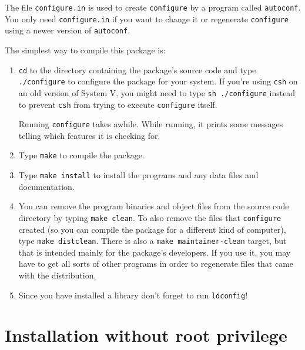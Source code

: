    The file \verb+configure.in+ is used to create \verb+configure+ by a program
called \verb+autoconf+.  You only need \verb+configure.in+ if you want to change
it or regenerate \verb+configure+ using a newer version of \verb+autoconf+.

The simplest way to compile this package is:
\begin{enumerate}
 \item \verb+cd+ to the directory containing the package's source code and type
     \verb+./configure+ to configure the package for your system.  If you're
     using \verb+csh+ on an old version of System V, you might need to type
     \verb+sh ./configure+ instead to prevent \verb+csh+ from trying to execute
     \verb+configure+ itself.

     Running \verb+configure+ takes awhile.  While running, it prints some
     messages telling which features it is checking for.
\item Type \verb+make+ to compile the package.

 \item Type \verb+make install+ to install the programs and any data files and
     documentation.

\item You can remove the program binaries and object files from the
     source code directory by typing \verb+make clean+.  To also remove the
     files that \verb+configure+ created (so you can compile the package for
     a different kind of computer), type \verb+make distclean+.  There is
     also a \verb+make maintainer-clean+ target, but that is intended mainly
     for the package's developers.  If you use it, you may have to get
     all sorts of other programs in order to regenerate files that came
     with the distribution.

\item Since you have installed a library don't forget to run \verb+ldconfig+!
\end{enumerate}
\section*{Installation without root privilege}


